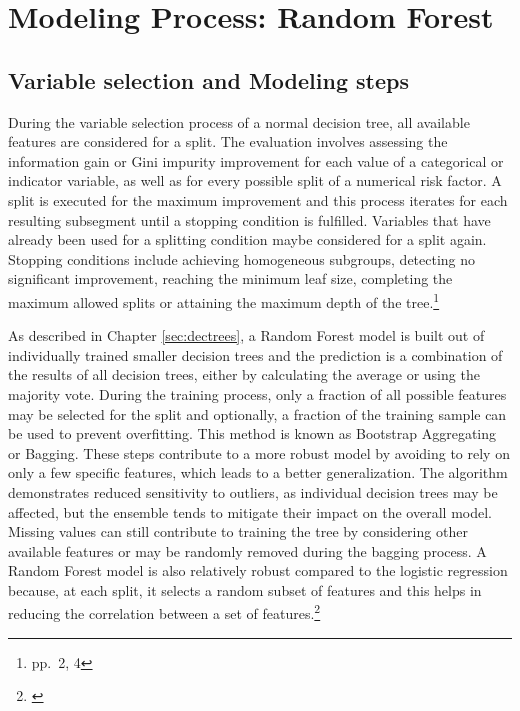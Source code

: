 \section{Modeling Process: Random Forest}

\subsection{Variable selection and Modeling steps}
\label{sec:mp_rf}
During the variable selection process of a normal decision tree, all available features are considered for a split. The evaluation involves assessing  the information gain or Gini impurity improvement for each value of a categorical or indicator variable, as well as for every possible split of a numerical risk factor. A split is executed for the maximum improvement and this process iterates for each resulting subsegment until a stopping condition is fulfilled. Variables that have already been used for a splitting condition maybe considered for a split again. Stopping conditions include achieving homogeneous subgroups, detecting no significant improvement, reaching the minimum leaf size, completing the maximum allowed splits or attaining the maximum depth of the tree.\footnote{\cite{BDT} pp.~2, 4}

As described in Chapter \ref{sec:dectrees}, a Random Forest model is built out of individually trained smaller decision trees and the prediction is a combination of the results of all decision trees, either by calculating the average or using the majority vote. During the training process, only a fraction of all possible features may be selected for the split and optionally, a fraction of the training sample can be used to prevent overfitting. This method is known as Bootstrap Aggregating or Bagging. These steps contribute to a more robust model by avoiding to rely on only a few specific features, which leads to a better generalization. The algorithm demonstrates reduced sensitivity to outliers, as individual decision trees may be affected, but the ensemble tends to mitigate their impact on the overall model. Missing values can still contribute to training the tree by considering other available features or may be randomly removed during the bagging process. A Random Forest model is also relatively robust compared to the logistic regression because, at each split, it selects a random subset of features and this helps in reducing the correlation between a set of features.\footnote{\cite{RanFor:2023}}

